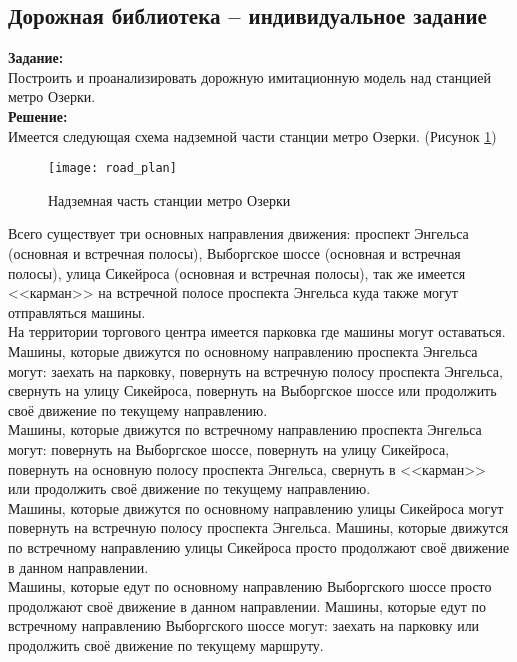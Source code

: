 \subsection*{Дорожная библиотека -- индивидуальное задание}

\textbf{Задание:}\\
Построить и проанализировать дорожную имитационную модель над станцией метро Озерки.\\

\textbf{Решение:}\\
Имеется следующая схема надземной части станции метро Озерки. (Рисунок \ref{fig:road_plan})
\begin{figure}[h]
	\centering \texttt{[image: road\_plan]}
	\caption{Надземная часть станции метро Озерки}
	\label{fig:road_plan}
\end{figure}

Всего существует три основных направления движения: проспект Энгельса (основная и встречная полосы), Выборгское шоссе (основная и встречная полосы), улица Сикейроса (основная и встречная полосы), так же имеется <<карман>> на встречной полосе проспекта Энгельса куда также могут отправляться машины.\\

На территории торгового центра имеется парковка где машины могут оставаться.\\

Машины, которые движутся по основному направлению проспекта Энгельса могут: заехать на парковку, повернуть на встречную полосу проспекта Энгельса, свернуть на улицу Сикейроса, повернуть на Выборгское шоссе или продолжить своё движение по текущему направлению.\\

Машины, которые движутся по встречному направлению проспекта Энгельса могут: повернуть на Выборгское шоссе, повернуть на улицу Сикейроса, повернуть на основную полосу проспекта Энгельса, свернуть в <<карман>> или продолжить своё движение по текущему направлению.\\

Машины, которые движутся по основному направлению улицы Сикейроса могут повернуть на встречную полосу проспекта Энгельса. Машины, которые движутся по встречному направлению улицы Сикейроса просто продолжают своё движение в данном направлении.\\

Машины, которые едут по основному направлению Выборгского шоссе просто продолжают своё движение в данном направлении. Машины, которые едут по встречному направлению Выборгского шоссе могут: заехать на парковку или продолжить своё движение по текущему маршруту.\\

